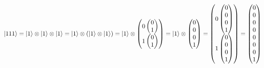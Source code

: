\documentclass{article}
\DeclarePairedDelimiter\ket{\lvert}{\rangle}
\begin{document}
\(
\ket{111} = 
\ket{1} \otimes \ket{1} \otimes \ket{1} = 
\ket{1} \otimes \left(\ket{1} \otimes \ket{1}\right) =  
\ket{1} \otimes \begin{pmatrix} 0 \begin{pmatrix} 0 \\ 1 \end{pmatrix} \\ 1  \begin{pmatrix} 0 \\ 1 \end{pmatrix} \end{pmatrix} =
\ket{1} \otimes \begin{pmatrix} 0 \\ 0 \\ 0 \\ 1 \end{pmatrix} =
\begin{pmatrix} 0 \begin{pmatrix} 0 \\ 0 \\ 0 \\ 1 \end{pmatrix} \\ 1 \begin{pmatrix} 0 \\ 0 \\ 0 \\ 1 \end{pmatrix} \end{pmatrix} =
\begin{pmatrix} 0 \\ 0 \\ 0 \\ 0 \\ 0 \\ 0 \\ 0 \\ 1 \end{pmatrix}
\)
\end{document}
